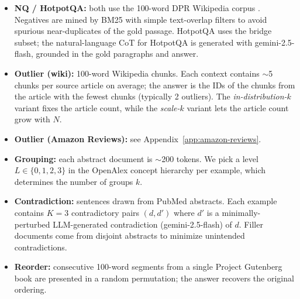 \begin{itemize}
\item \textbf{NQ / HotpotQA:} both use the 100-word DPR Wikipedia corpus \citep{Karpukhin2020DensePR}. Negatives are mined by BM25 with simple text-overlap filters to avoid spurious near-duplicates of the gold passage. HotpotQA uses the bridge subset; the natural-language CoT for HotpotQA is generated with gemini-2.5-flash, grounded in the gold paragraphs and answer.
\item \textbf{Outlier (wiki):} 100-word Wikipedia chunks. Each context contains $\sim$5 chunks per source article on average; the answer is the IDs of the chunks from the article with the fewest chunks (typically 2 outliers). The \emph{in-distribution-$k$} variant fixes the article count, while the \emph{scale-$k$} variant lets the article count grow with $N$.
\item \textbf{Outlier (Amazon Reviews):} see Appendix~\ref{app:amazon-reviews}.
\item \textbf{Grouping:} each abstract document is $\sim$200 tokens. We pick a level $L\in\{0,1,2,3\}$ in the OpenAlex concept hierarchy per example, which determines the number of groups $k$.
\item \textbf{Contradiction:} sentences drawn from PubMed abstracts. Each example contains $K{=}3$ contradictory pairs $(d, d')$ where $d'$ is a minimally-perturbed LLM-generated contradiction (gemini-2.5-flash) of $d$. Filler documents come from disjoint abstracts to minimize unintended contradictions.
\item \textbf{Reorder:} consecutive 100-word segments from a single Project Gutenberg book are presented in a random permutation; the answer recovers the original ordering.
\end{itemize}
